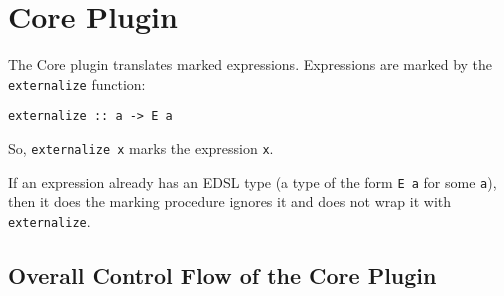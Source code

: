 \documentclass[sigplan,screen]{acmart}
\newcommand{\ttt}{\texttt}
\begin{document}
\section{Core Plugin}

The Core plugin translates marked expressions. Expressions are marked by
the \ttt{externalize} function:

\begin{lstlisting}
externalize :: a -> E a
\end{lstlisting}

So, \ttt{externalize x} marks the expression \ttt{x}.

If an expression already has an EDSL type (a type of the form \ttt{E a} for some
\ttt{a}), then it does the marking procedure ignores it and does not wrap it with
\ttt{externalize}.

\clearpage
\subsection{Overall Control Flow of the Core Plugin}
\end{document}
